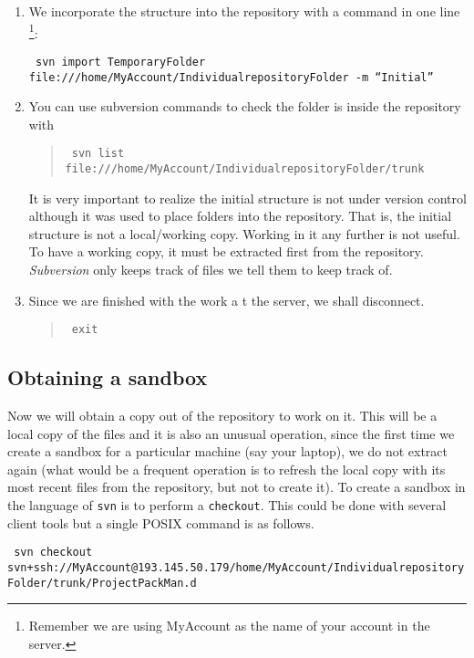 \documentclass[article,12pt]{article}
\begin{document}
\begin{enumerate}
\item We incorporate the structure into the repository with a command in one line
\footnote{
Remember we are using
MyAccount as the name of your account in the server.}:
\begin{flushleft}
{\small
{\tt
svn import TemporaryFolder file:///home/MyAccount/IndividualrepositoryFolder -m ``Initial''
}
}
\end{flushleft}

\item You can use subversion commands to check the folder is inside the
repository with
\begin{quote}
{\small
{\tt
svn list file:///home/MyAccount/IndividualrepositoryFolder/trunk
}}
\end{quote}
It is very important to realize the initial structure is not under version control
although it was used to place folders into the repository.
That is, the initial structure is not a local/working copy.
Working in it any further is not useful. To have a working copy,
it must be extracted first from the repository.
{\em Subversion} only keeps track of files we tell them to keep track of.

\item Since we are finished with the work a t the server, we shall disconnect.
\begin{quote}
{\tt
exit
}
\end{quote}

\end{enumerate}


\subsection*{ Obtaining a sandbox}
Now we will obtain a copy out of the repository to work on it.
This will be a local copy of the files and it is also an unusual
operation, since the first time we create a sandbox
for a particular machine (say your laptop), we do not extract
again (what would be a frequent operation is to refresh the local
copy with its most recent files from the repository, but not to
create it).
To create a  sandbox in the language of {\tt svn} is to perform
a {\tt checkout}.
This could be done with several client tools but a single POSIX command is
as follows.
\begin{flushleft}
{\scriptsize
{\tt
svn checkout svn+ssh://MyAccount@193.145.50.179/home/MyAccount/IndividualrepositoryFolder/trunk/ProjectPackMan.d
}
}
\end{flushleft}
\end{document}
